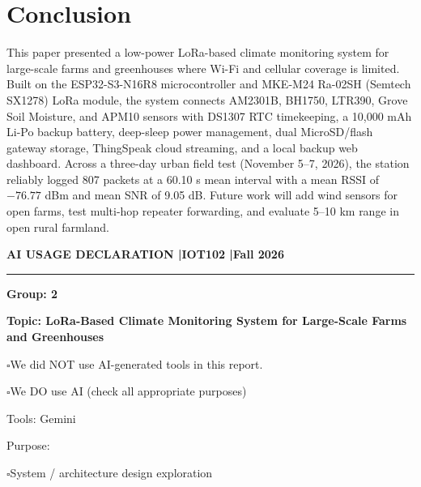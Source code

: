 \documentclass[conference,onecolumn]{IEEEtran}
\newcommand{\uncheckedbox}{$\square$}
\newcommand{\checkedbox}{\rlap{$\checkmark$}$\square$}
\begin{document}
\section{Conclusion}
This paper presented a low-power LoRa-based climate monitoring system for large-scale farms and greenhouses where Wi-Fi and cellular coverage is limited. Built on the ESP32-S3-N16R8 microcontroller and MKE-M24 Ra-02SH (Semtech SX1278) LoRa module, the system connects AM2301B, BH1750, LTR390, Grove Soil Moisture, and APM10 sensors with DS1307 RTC timekeeping, a 10,000 mAh Li-Po backup battery, deep-sleep power management, dual MicroSD/flash gateway storage, ThingSpeak cloud streaming, and a local backup web dashboard. Across a three-day urban field test (November 5--7, 2026), the station reliably logged 807 packets at a 60.10 s mean interval with a mean RSSI of $-76.77$ dBm and mean SNR of 9.05 dB. Future work will add wind sensors for open farms, test multi-hop repeater forwarding, and evaluate 5--10 km range in open rural farmland.




\clearpage
\begin{center}
{\large\textbf{AI USAGE DECLARATION \enspace|\enspace IOT102 \enspace|\enspace Fall 2026}}
\end{center}
\noindent\rule{\textwidth}{0.6pt}

\vspace{8pt}
\noindent\textbf{Group: 2}

\vspace{8pt}
\noindent\textbf{Topic: LoRa-Based Climate Monitoring System for Large-Scale Farms and Greenhouses}

\vspace{10pt}
\noindent\uncheckedbox\enspace We did NOT use AI-generated tools in this report.

\vspace{6pt}
\noindent\checkedbox\enspace We DO use AI (check all appropriate purposes)

\vspace{6pt}
\noindent\hspace*{1.5em}Tools: Gemini

\vspace{6pt}
\noindent\hspace*{1.5em}Purpose:

\vspace{4pt}
\noindent\hspace*{2.5em}\checkedbox\enspace System / architecture design exploration
\end{document}
